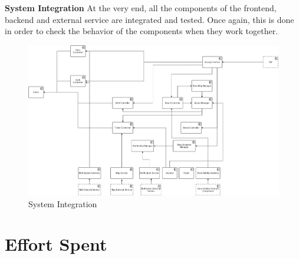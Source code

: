 \documentclass[a4paper, 12pt, oneside, table]{article}
\begin{document}
\newpage

\textbf{System Integration}
At the very end, all the components of the frontend, backend and external service are integrated and tested.
Once again, this is done in order to check the behavior of the components when they work together.

\begin{figure}[H]
\centering
    \centering
    \includegraphics[height=0.4\textheight, width=1\linewidth, keepaspectratio]{img/system_integration.png}
    \caption{System Integration}
    \label{system_integration}
\end{figure}




\newpage

\section{Effort Spent}
\end{document}

